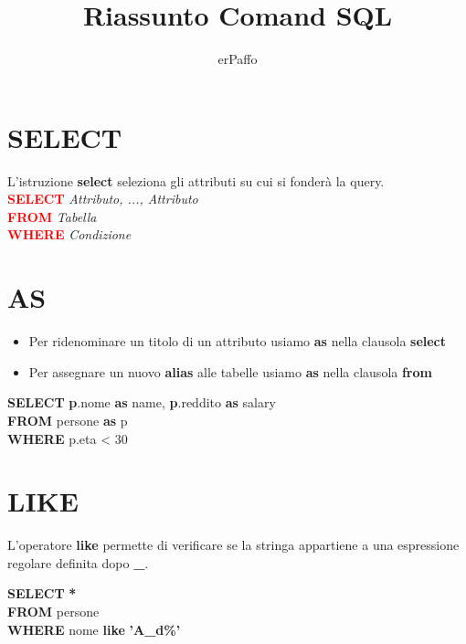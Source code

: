 \documentclass[12pt, a4paper]{article}
\title{Riassunto Comand SQL}
\author{erPaffo}
\begin{document}
	\maketitle
	\tableofcontents
	\begin{frame}
		
		\section{SELECT}
		
			L'istruzione \textbf{select} seleziona gli attributi su cui si fonderà la query.  \\
		
			\textcolor{red}{\textbf{SELECT}} \emph{Attributo, ..., Attributo}  \\
 			\textcolor{red}{\textbf{FROM}} \emph{Tabella}  \\
			\textcolor{red}{\textbf{WHERE}} \emph{Condizione}  \\
		
		\section{AS}
			\begin{itemize} 
			\item Per ridenominare un titolo di un attributo usiamo \textbf{as} nella clausola \textbf{select} 
			\item Per assegnare un nuovo \textbf{alias} alle tabelle usiamo \textbf{as} nella clausola \textbf{from}
			\end{itemize}

			\begin{center}
			\justifying
			\textbf{SELECT} \textbf{p}.nome \textbf{as} name,  \textbf{p}.reddito \textbf{as} salary \\
 			\textbf{FROM} persone \textbf{as} p  \\
			\textbf{WHERE} p.eta < 30  \\
			\end{center} 

		\section{LIKE}
			L'operatore \textbf{like} permette di verificare se la stringa appartiene a una espressione regolare definita dopo \textbf{\_}.
			\begin{center}
			\justifying
			\textbf{SELECT} \textbf{*} \\
 			\textbf{FROM} persone \\
			\textbf{WHERE} nome \textbf{like} \textbf{'A\_d\%'}  \\
			\end{center} 
			

\end{frame}
\end{document}
